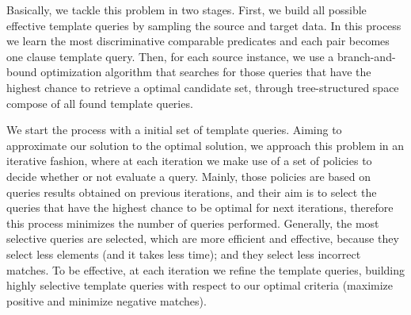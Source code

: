 
Basically, we tackle this problem in two stages. First, we build all possible effective template queries by sampling the source and target data. In this process we learn the most discriminative comparable predicates and each pair becomes one clause template query. Then, for each source instance, we use a branch-and-bound optimization algorithm that searches for those queries that have the highest chance to retrieve a optimal candidate set, through tree-structured space compose of all found template queries. 

We start the process with a initial set of template queries. Aiming to approximate our solution to the optimal solution, we approach this problem in an iterative fashion, where at each iteration we make use of a set of policies to decide whether or not evaluate a query. Mainly, those policies are based on queries results obtained on previous iterations, and their aim is to select the queries that have the highest chance to be optimal for next iterations, therefore this process minimizes the number of queries performed. Generally, the most selective queries are selected, which are more efficient and effective, because they select less elements (and it takes less time); and they select less incorrect matches. To be effective, at each iteration we refine the template queries, building highly selective template queries with respect to our optimal criteria (maximize positive and minimize negative matches). 

